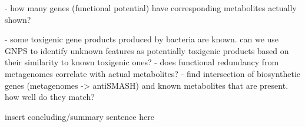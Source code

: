 \documentclass[12pt]{article}
\begin{document}
- how many genes (functional potential) have corresponding metabolites actually shown?

- some toxigenic gene products produced by bacteria are known. can we use GNPS to identify unknown features as potentially toxigenic products based on their similarity to known toxigenic ones?
- does functional redundancy from metagenomes correlate with actual metabolites?
- find intersection of biosynthetic genes (metagenomes -> antiSMASH) and known metabolites that are present. how well do they match?

insert concluding/summary sentence here

\pagebreak

\section*{\refname}
\footnotesize{

\par}
\end{document}
